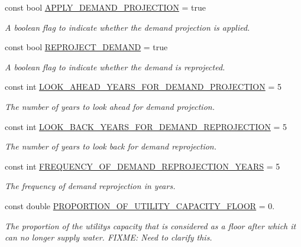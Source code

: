 \begin{DoxyCompactItemize}
const bool \mbox{\hyperlink{classConstants_a5e07359a710816068fb67cda81726a3c}{A\+P\+P\+L\+Y\+\_\+\+D\+E\+M\+A\+N\+D\+\_\+\+P\+R\+O\+J\+E\+C\+T\+I\+ON}} = true
\begin{DoxyCompactList}\small\item\em A boolean flag to indicate whether the demand projection is applied. \end{DoxyCompactList}\item 
const bool \mbox{\hyperlink{classConstants_a3c15db7c12db84d9262829a66f2a2279}{R\+E\+P\+R\+O\+J\+E\+C\+T\+\_\+\+D\+E\+M\+A\+ND}} = true
\begin{DoxyCompactList}\small\item\em A boolean flag to indicate whether the demand is reprojected. \end{DoxyCompactList}\item 
const int \mbox{\hyperlink{classConstants_a3b7155d857b5a095dffb26857b4fcef7}{L\+O\+O\+K\+\_\+\+A\+H\+E\+A\+D\+\_\+\+Y\+E\+A\+R\+S\+\_\+\+F\+O\+R\+\_\+\+D\+E\+M\+A\+N\+D\+\_\+\+P\+R\+O\+J\+E\+C\+T\+I\+ON}} = 5
\begin{DoxyCompactList}\small\item\em The number of years to look ahead for demand projection. \end{DoxyCompactList}\item 
const int \mbox{\hyperlink{classConstants_acf92dd535e2adb0204c63e83e63cc139}{L\+O\+O\+K\+\_\+\+B\+A\+C\+K\+\_\+\+Y\+E\+A\+R\+S\+\_\+\+F\+O\+R\+\_\+\+D\+E\+M\+A\+N\+D\+\_\+\+R\+E\+P\+R\+O\+J\+E\+C\+T\+I\+ON}} = 5
\begin{DoxyCompactList}\small\item\em The number of years to look back for demand reprojection. \end{DoxyCompactList}\item 
const int \mbox{\hyperlink{classConstants_ae0245d63696298b7ba5690950d7b5e87}{F\+R\+E\+Q\+U\+E\+N\+C\+Y\+\_\+\+O\+F\+\_\+\+D\+E\+M\+A\+N\+D\+\_\+\+R\+E\+P\+R\+O\+J\+E\+C\+T\+I\+O\+N\+\_\+\+Y\+E\+A\+RS}} = 5
\begin{DoxyCompactList}\small\item\em The frequency of demand reprojection in years. \end{DoxyCompactList}\item 
const double \mbox{\hyperlink{classConstants_af15fd076d56c8c4fb25b7bd681e725d4}{P\+R\+O\+P\+O\+R\+T\+I\+O\+N\+\_\+\+O\+F\+\_\+\+U\+T\+I\+L\+I\+T\+Y\+\_\+\+C\+A\+P\+A\+C\+I\+T\+Y\+\_\+\+F\+L\+O\+OR}} = 0.
\begin{DoxyCompactList}\small\item\em The proportion of the utility\textquotesingle{}s capacity that is considered as a floor after which it can no longer supply water. F\+I\+X\+ME\+: Need to clarify this. \end{DoxyCompactList}\item 

\end{DoxyCompactItemize}
